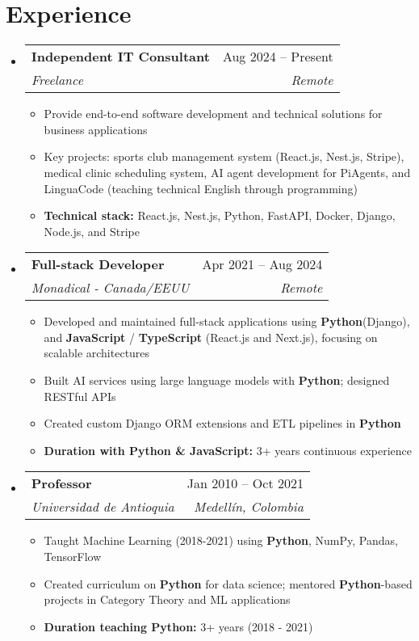 \documentclass[letterpaper,11pt]{article}
\makeatletter
\newcommand{\resumeSubheading}[4]{
  \vspace{-2pt}
  \item[]
  \begin{tabular*}{\textwidth}{@{\extracolsep{\fill}}l r}
    \textbf{#1} & #2 \\
    \textit{#3} & \textit{#4} \\
  \end{tabular*}
  \vspace{-5pt}
}
\makeatother
\begin{document}
\section{Experience}
\begin{itemize}[leftmargin=0pt, itemindent=0pt, label={}, itemsep=1pt]
\resumeSubheading
{Independent IT Consultant}{Aug 2024 -- Present}
{Freelance}{Remote}
\begin{itemize}[leftmargin=*, itemsep=0pt]
    \item Provide end-to-end software development and technical solutions for business applications
    \item Key projects: sports club management system (React.js, Nest.js, Stripe), medical clinic scheduling system, AI agent development for PiAgents, and LinguaCode (teaching technical English through programming)
    \item \textbf{Technical stack:} React.js, Nest.js, Python, FastAPI, Docker, Django, Node.js, and Stripe
\end{itemize}

\resumeSubheading
{Full-stack Developer}{Apr 2021 -- Aug 2024}
{Monadical - Canada/EEUU}{Remote}
\begin{itemize}[leftmargin=*, itemsep=0pt]
    \item Developed and maintained full-stack applications using \textbf{Python}(Django), and \textbf{JavaScript} / \textbf{TypeScript} (React.js and Next.js), focusing on scalable architectures
    \item Built AI services using large language models with \textbf{Python}; designed RESTful APIs
    \item Created custom Django ORM extensions and ETL pipelines in \textbf{Python}
    \item \textbf{Duration with Python \& JavaScript:} 3+ years continuous experience
\end{itemize}

\resumeSubheading
{Professor}{Jan 2010 -- Oct 2021}
{Universidad de Antioquia}{Medellín, Colombia}
\begin{itemize}[leftmargin=*, itemsep=0pt]
    \item Taught Machine Learning (2018-2021) using \textbf{Python}, NumPy, Pandas, TensorFlow
    \item Created curriculum on \textbf{Python} for data science; mentored \textbf{Python}-based projects in Category Theory and ML applications
    \item \textbf{Duration teaching Python:} 3+ years (2018 - 2021)
\end{itemize}


\end{itemize}
\end{document}
